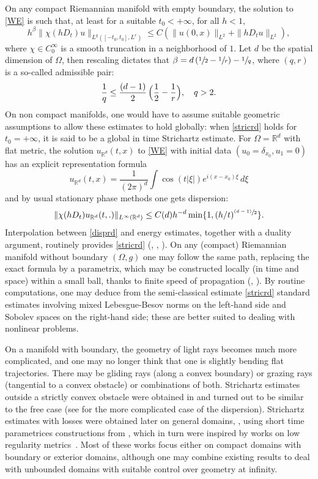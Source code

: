\documentclass[11pt]{article}
\newcommand{\psfrac}[2]{\sfrac{(#1)}{#2}}
\theoremstyle{plain}
\theoremstyle{definition}
\begin{document}
On any compact Riemannian manifold with empty boundary, the solution to \eqref{WE} is such that, at least for a suitable $t_{0}<+\infty$, for all $h<1$,
\begin{equation}\label{stricrd} h^{\beta}\|\chi(hD_t)u\|_{L^q([-t_{0},t_{0}],
L^r)}\leq C\left(\|u(0,x)\|_{L^2}+\|hD_t u\|_{L^2}\right),
\end{equation}
where $\chi\in C^{\infty}_0$ is a smooth truncation in a neighborhood of $1$. Let $d$ be the spatial dimension of $\Omega$, then rescaling dictates that $\beta=d\left(\sfrac 12-\sfrac 1r\right)-\sfrac 1q$, where $(q,r)$ is a so-called admissible pair:
\begin{equation}\label{adm}
\frac 1q\leq \frac{(d-1)} 2\, \Bigl(\frac{1}{2}-\frac{1}{r}\Bigr),\quad q>2.
\end{equation}
On non compact manifolds, one would have to assume suitable geometric assumptions to allow these estimates to hold globally: when \eqref{stricrd} holds for $t_{0}=+\infty$, it is said to be a global in time Strichartz estimate. For $\Omega=\mathbb{R}^d$ with flat metric, the solution $u_{\mathbb{R}^d}(t,x)$ to
\eqref{WE} with initial data $(u_0=\delta_{x_{0}}, u_1=0)$ has an explicit representation formula
\[
u_{\mathbb{R}^d}(t,x)=\frac{1}{(2\pi)^d}\int
\cos(t|\xi|)e^{i(x-x_{0})\xi}\,d\xi
\]
and by usual stationary phase methods one gets dispersion:
\begin{equation}\label{disprd}
\|\chi(hD_t)u_{\mathbb{R}^d}(t,.)\|_{L^{\infty}(\mathbb{R}^d)}\leq
C(d) h^{-d}\min\{1, (h/t)^{\psfrac{d-1}{2}}\}.
\end{equation}
Interpolation between \eqref{disprd} and energy estimates, together with a duality argument, routinely provides
\eqref{stricrd} (\cite{Stri77}, \cite{Pe84}, \cite{GV85}). On any (compact) Riemannian manifold without boundary $(\Omega,g)$ one may follow the same path, replacing the exact formula by a parametrix, which may be constructed locally (in time and space) within a small ball, thanks to finite speed of propagation (\cite{Kapi89}, \cite{MSS93}). By routine computations, one may deduce from the semi-classical estimate \eqref{stricrd} standard estimates involving mixed Lebesgue-Besov norms on the left-hand side and Sobolev spaces on the right-hand side; these are better suited to dealing with nonlinear problems.

On a manifold with boundary, the geometry of light rays becomes much more complicated, and one may no longer think that one is slightly bending flat trajectories. There may be gliding rays (along a convex boundary) or grazing rays (tangential to a convex obstacle) or combinations of both. Strichartz estimates outside a strictly convex obstacle were obtained in \cite{smso95} and turned out to be similar to the free case (see \cite{ildispext} for the more complicated case of the dispersion). Strichartz estimates with losses were obtained later on general domains, \cite{blsmso08}, using short time parametrices constructions from \cite{smso06}, which in turn were inspired by works on low regularity metrics~\cite{tat02}. Most of these works focus either on compact domains with boundary or exterior domains, although one may combine existing results to deal with unbounded domains with suitable control over geometry at infinity.
\end{document}
